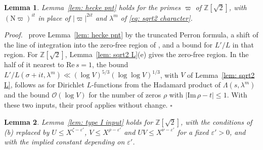 \documentclass{article}
\numberwithin{equation}{section}
\newtheorem{lemma}{Lemma}
\newenvironment{proof}[1][Proof]{\par\medskip\noindent\textit{#1.}\ }{\hfill$\square$\par\medskip}
\newcommand{\Le}{\leqslant}
\begin{document}
\begin{lemma}
\label{lem: sqrt2 hecke pnt}
Lemma~\ref{lem: hecke pnt} holds for the primes $\varpi$ of $\mathbb{Z}[\sqrt{2}]$, with $(\mathrm{N}\varpi)^{it}$ in place of $|\varpi|^{2it}$ and $\lambda^m$ of \eqref{eq: sqrt2 character}.
\end{lemma}

\begin{proof}
\citet[p.~125]{harman2001gaussian} prove Lemma~\ref{lem: hecke pnt} by the truncated Perron formula, a shift of the line of integration into the zero-free region of \citet{coleman1990zero}, and a bound for $L'/L$ in that region. For $\mathbb{Z}[\sqrt{2}]$, Lemma~\ref{lem: sqrt2 L}(e) gives the zero-free region. In the half of it nearest to $\mathrm{Re}\, s = 1$, the bound $L'/L(\sigma + it, \lambda^m) \ll (\log V)^{5/3} (\log\log V)^{1/3}$, with $V$ of Lemma~\ref{lem: sqrt2 L}, follows as for Dirichlet $L$-functions from the Hadamard product of $\Lambda(s, \lambda^m)$ and the bound $\mathcal{O}(\log V)$ for the number of zeros $\rho$ with $|\mathrm{Im}\, \rho - t| \Le 1$. With these two inputs, their proof applies without change.
\end{proof}

\begin{lemma}
\label{lem: sqrt2 type I input}
Lemma~\ref{lem: type I input} holds for $\mathbb{Z}[\sqrt{2}]$, with the conditions of (b) replaced by $U \Le X^{\zeta - \varepsilon'}$, $V \Le X^{\rho - \varepsilon'}$ and $UV \Le X^{\nu - \varepsilon'}$ for a fixed $\varepsilon' > 0$, and with the implied constant depending on $\varepsilon'$.
\end{lemma}
\end{document}
